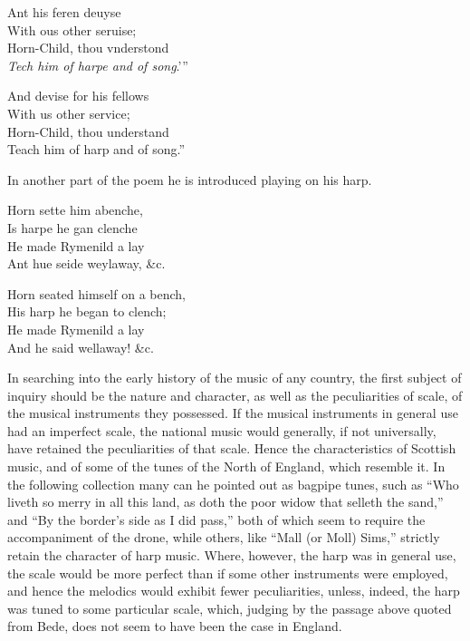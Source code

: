 

\settowidth{\versewidth}{Horn-Child, thou vnderstond}
\begin{dcverse}
Ant his feren deuyse\\
With ous other seruise;\\
Horn-Child, thou vnderstond\\
\textit{Tech him of harpe and of song}.’”

And devise for his fellows\\
With us other service;\\
Horn-Child, thou understand\\
Teach him of harp and of song.”
\end{dcverse}

\noindent In another part of the poem he is introduced playing on his harp. 

\begin{dcverse}
Horn sette him abenche,\\
Is harpe he gan clenche\\
He made Rymenild a lay\\
Ant hue seide weylaway, \&c.

Horn seated himself on a bench,\\
His harp he began to clench;\\
He made Rymenild a lay\\
And he said wellaway! \&c.
\end{dcverse}

In searching into the early history of the music of any country, the first
subject of inquiry should be the nature and character, as well as the peculiarities
of scale, of the musical instruments they possessed. If the musical instruments
in general use had an imperfect scale, the national music would generally, if not
universally, have retained the peculiarities of that scale. Hence the characteristics
of Scottish music, and of some of the tunes of the North of England, which resemble
it. In the following collection many can he pointed out as bagpipe tunes,
such as “Who liveth so merry in all this land, as doth the poor widow that selleth
the sand,” and “By the border’s side as I did pass,” both of which seem to
require the accompaniment of the drone, while others, like “Mall (or Moll)
Sims,” strictly retain the character of harp music. Where, however, the harp
was in general use, the scale would be more perfect than if some other instruments
were employed, and hence the melodics would exhibit fewer peculiarities,
unless, indeed, the harp was tuned to some particular scale, which, judging by
the passage above quoted from Bede, does not seem to have been the case in
England.


